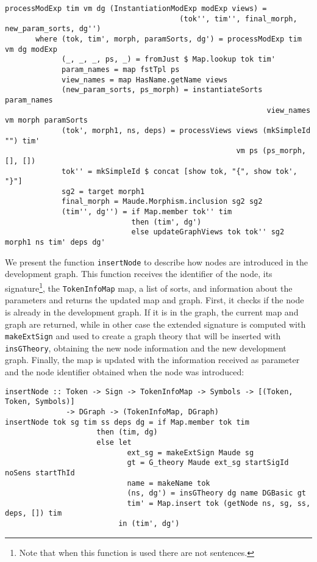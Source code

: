 \begin{itemize}
{\codesize
\begin{verbatim}
processModExp tim vm dg (InstantiationModExp modExp views) = 
                                        (tok'', tim'', final_morph, new_param_sorts, dg'')
       where (tok, tim', morph, paramSorts, dg') = processModExp tim vm dg modExp
             (_, _, _, ps, _) = fromJust $ Map.lookup tok tim'
             param_names = map fstTpl ps
             view_names = map HasName.getName views
             (new_param_sorts, ps_morph) = instantiateSorts param_names 
                                                            view_names vm morph paramSorts
             (tok', morph1, ns, deps) = processViews views (mkSimpleId "") tim' 
                                                     vm ps (ps_morph, [], [])
             tok'' = mkSimpleId $ concat [show tok, "{", show tok', "}"]
             sg2 = target morph1
             final_morph = Maude.Morphism.inclusion sg2 sg2
             (tim'', dg'') = if Map.member tok'' tim
                             then (tim', dg')
                             else updateGraphViews tok tok'' sg2 morph1 ns tim' deps dg'
\end{verbatim}
}

\end{itemize}

We present the function \verb"insertNode" to describe how nodes are
introduced in the development graph. This function receives the
identifier of the node, its signature\footnote{Note that when this
function is used there are not sentences.}, the \verb"TokenInfoMap" map,
a list of sorts, and information about the parameters and
returns the updated map and graph. First, it checks if
the node is already in the development graph. If it is in the graph,
the current map and graph are returned, while in other case the extended
signature is computed with \verb"makeExtSign" and used to create a graph
theory that will be inserted with \verb"insGTheory", obtaining the new
node information and the new development graph. Finally, the map is
updated with the information received as parameter and the node identifier
obtained when the node was introduced:

{\codesize
\begin{verbatim}
insertNode :: Token -> Sign -> TokenInfoMap -> Symbols -> [(Token, Token, Symbols)]
              -> DGraph -> (TokenInfoMap, DGraph)
insertNode tok sg tim ss deps dg = if Map.member tok tim
                     then (tim, dg)
                     else let
                            ext_sg = makeExtSign Maude sg
                            gt = G_theory Maude ext_sg startSigId noSens startThId
                            name = makeName tok
                            (ns, dg') = insGTheory dg name DGBasic gt
                            tim' = Map.insert tok (getNode ns, sg, ss, deps, []) tim
                          in (tim', dg')
\end{verbatim}
}


